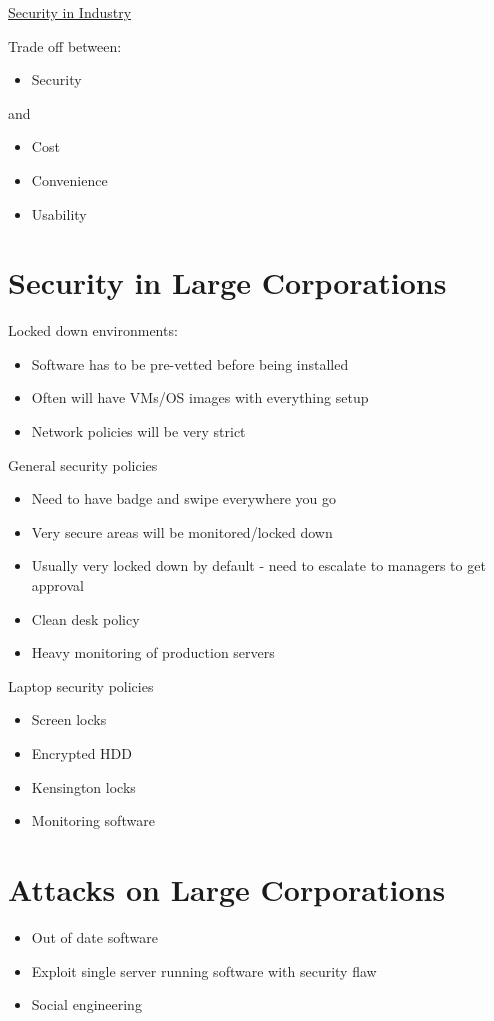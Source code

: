 \documentclass{article}[18pt]
\begin{document}
\begin{center}
\underline{\huge Security in Industry}
\end{center}
Trade off between:
\begin{itemize}
	\item Security
\end{itemize}
and
\begin{itemize}
	\item Cost
	\item Convenience
	\item Usability
\end{itemize}
\section{Security in Large Corporations}
Locked down environments:
\begin{itemize}
	\item Software has to be pre-vetted before being installed
	\item Often will have VMs/OS images with everything setup
	\item Network policies will be very strict
\end{itemize}
General security policies
\begin{itemize}
	\item Need to have badge and swipe everywhere you go
	\item Very secure areas will be monitored/locked down
	\item Usually very locked down by default - need to escalate to managers to get approval
	\item Clean desk policy
	\item Heavy monitoring of production servers
\end{itemize}
Laptop security policies
\begin{itemize}
	\item Screen locks
	\item Encrypted HDD
	\item Kensington locks
	\item Monitoring software
\end{itemize}
\section{Attacks on Large Corporations}
\begin{itemize}
	\item Out of date software
	\item Exploit single server running software with security flaw
	\item Social engineering
\end{itemize}
\end{document}
